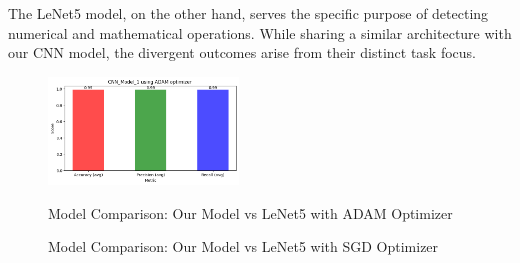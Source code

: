\noindent The LeNet5 model, on the other hand, serves the specific purpose of detecting numerical and mathematical operations. While sharing a similar architecture with our CNN model, the divergent outcomes arise from their distinct task focus.

\begin{figure}[htbp]
  \centering

  \includegraphics[width=0.45\textwidth]{Images/Results_Discussions/CNN_Model_1 ADAM.png}
  \hfill
  \caption{Model Comparison: Our Model vs LeNet5 with ADAM Optimizer}

  \vspace{0.5cm} %

  \hfill
  \caption{Model Comparison: Our Model vs LeNet5 with SGD Optimizer}
  
\end{figure}

